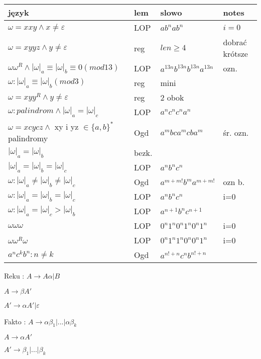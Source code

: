 
\begin{tabular}{l|l|l|l}
  język & lem & slowo & notes\\
  \hline
    $\omega = xxy \wedge x \neq \varepsilon $ & LOP & 
    $ab^{n}ab^{n}$ & $i=0$ \\
  \hline 
    $\omega = xyyz \wedge y \neq \varepsilon $ & reg & 
    $len \geqslant 4$ & dobrać krótsze \\
  \hline
    $\omega \omega ^{R} \wedge |\omega|_{a}\equiv |\omega|_{b} \equiv 0 (mod 13) $ & LOP & 
    $a^{13n}b^{13n}b^{13n}a^{13n}$ & ozn. \\
  \hline
  $\omega : |\omega|_{a}\equiv |\omega|_{b}(mod 3) $ & reg & 
  mini & \\
  \hline
    $\omega = xyy^{R} \wedge y \neq \varepsilon$ & reg & 
    2 obok & \\
  \hline
    $\omega:palindrom \wedge |\omega|_{a} = |\omega|_{c} $ & LOP & 
    $a^{n}c^{n}c^{n}a^{n}$ \\
  \hline
    $\omega = xcycz \wedge$ xy i yz $\in \lbrace a,b \rbrace ^{*}$palindromy & Ogd & $a^{m}bca^{m}cba^{m}$ & śr. ozn. \\
  \hline
    $|\omega|_{a} = |\omega|_{b}$ & bezk. & \\
  \hline
    $|\omega|_{a} = |\omega|_{b}= |\omega|_{c}$ & LOP & $a^{n}b^{n}c^{n}$ & \\
  \hline
    $\omega : |\omega|_{a} \neq |\omega|_{b} \neq |\omega|_{c}$ & Ogd & $a^{m+m!}b^{m}a^{m+m!}$ & ozn b.\\
  \hline 
    $\omega : |\omega|_{a} = |\omega|_{b} = |\omega|_{c}$ & LOP & $a^{n}b^{n}c^{n}$ & i=0\\
  \hline
    $\omega : |\omega|_{a} = |\omega|_{c} > |\omega|_{b}$ & LOP & $a^{n+1}b^{n}c^{n+1}$ &\\
  \hline
    $\omega\omega\omega$ & LOP & $0^{n}1^{n}0^{n}1^{n}0^{n}1^{n}$ & i=0\\
  \hline
    $\omega\omega^{R}\omega$ & LOP & $0^{n}1^{n}1^{n}0^{n}0^{n}1^{n}$ & i=0\\
  \hline
    $a^{n}c^{k}b^{n} : n \neq k$ & Ogd & $a^{n!+n}c^{n}b^{n!+n}$& \\
\end{tabular}

Reku : $A \rightarrow A \alpha | B$

$A \rightarrow \beta A'$

$A' \rightarrow \alpha A' | \varepsilon $

Fakto : $A \rightarrow \alpha \beta _{1}|...|\alpha \beta _{k}$

$A \rightarrow \alpha A'$

$A' \rightarrow \beta _{1}|...|\beta _{k}$
